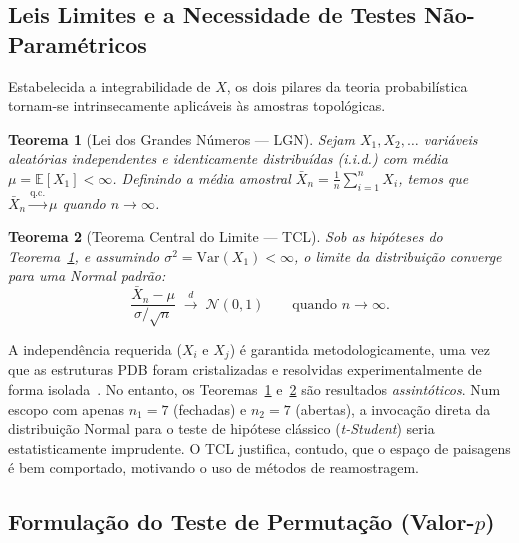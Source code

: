 \documentclass[12pt, a4paper]{article}
\newtheorem{theorem}{Teorema}
\begin{document}
\subsection{Leis Limites e a Necessidade de Testes Não-Paramétricos}
 
Estabelecida a integrabilidade de $X$, os dois pilares da teoria probabilística tornam-se intrinsecamente aplicáveis às amostras topológicas.
 
\begin{theorem}[Lei dos Grandes Números — LGN] \label{teo:lgn}
  Sejam $X_{1}, X_{2}, \ldots$ variáveis aleatórias independentes e identicamente distribuídas (i.i.d.) com média $\mu = \mathbb{E}[X_{1}] < \infty$. Definindo a média amostral $\bar{X}_{n} = \frac{1}{n}\sum_{i=1}^{n} X_{i}$, temos que $\bar{X}_{n} \xrightarrow{\text{q.c.}} \mu$ quando $n \to \infty$.
\end{theorem}
 
\begin{theorem}[Teorema Central do Limite — TCL] \label{teo:tcl}
  Sob as hipóteses do Teorema~\ref{teo:lgn}, e assumindo $\sigma^{2} = \mathrm{Var}(X_{1}) < \infty$, o limite da distribuição converge para uma Normal padrão:
  \[
    \frac{\bar{X}_{n} - \mu}{\sigma / \sqrt{n}} \;\xrightarrow{\;d\;}\; \mathcal{N}(0,1) \qquad \text{quando } n \to \infty.
  \]
\end{theorem}
 
A independência requerida ($X_i$ e $X_j$) é garantida metodologicamente, uma vez que as estruturas PDB foram cristalizadas e resolvidas experimentalmente de forma isolada~\cite{kovacev2016}. No entanto, os Teoremas~\ref{teo:lgn} e~\ref{teo:tcl} são resultados \emph{assintóticos}. Num escopo com apenas $n_{1} = 7$ (fechadas) e $n_{2} = 7$ (abertas), a invocação direta da distribuição Normal para o teste de hipótese clássico (\textit{t-Student}) seria estatisticamente imprudente. O TCL justifica, contudo, que o espaço de paisagens é bem comportado, motivando o uso de métodos de reamostragem.
 
\subsection{Formulação do Teste de Permutação (Valor-\texorpdfstring{$p$}{p})}
 
\end{document}
